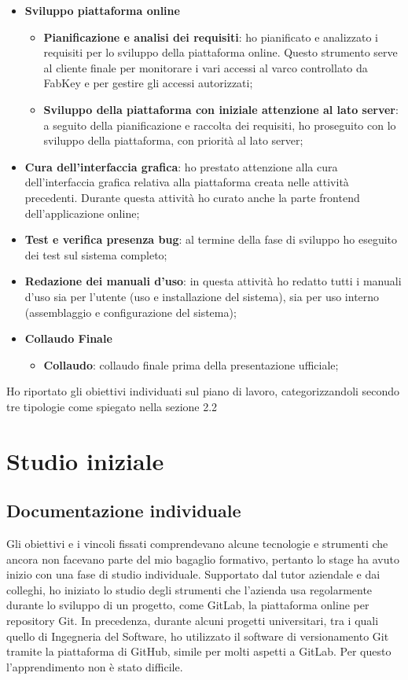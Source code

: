 \begin{itemize}
\item \textbf{Sviluppo piattaforma online}
\begin{itemize}
	\item \textbf{Pianificazione e analisi dei requisiti}: ho pianificato e analizzato i requisiti per lo sviluppo della piattaforma online. Questo strumento serve al cliente finale per monitorare i vari accessi al varco controllato da FabKey e per gestire gli accessi autorizzati;
	\item \textbf{Sviluppo della piattaforma con iniziale attenzione al lato server}: a seguito della pianificazione e raccolta dei requisiti, ho proseguito con lo sviluppo della piattaforma, con priorità al lato server;
\end{itemize}

\item \textbf{Cura dell'interfaccia grafica}: ho prestato attenzione alla cura dell'interfaccia grafica relativa alla piattaforma creata nelle attività precedenti. Durante questa attività ho curato anche la parte frontend dell'applicazione online;
\item \textbf{Test e verifica presenza bug}: al termine della fase di sviluppo ho eseguito dei test sul sistema completo;
\item \textbf{Redazione dei manuali d’uso}: in questa attività ho redatto tutti i manuali d'uso sia per l'utente (uso e installazione del sistema), sia per uso interno (assemblaggio e configurazione del sistema);

\item \textbf{Collaudo Finale}
\begin{itemize}
	\item \textbf{Collaudo}: collaudo finale prima della presentazione ufficiale;
\end{itemize}
\end{itemize}

\medskip

Ho riportato gli obiettivi individuati sul piano di lavoro, categorizzandoli secondo tre tipologie come spiegato nella sezione 2.2


\section{Studio iniziale}
\subsection{Documentazione individuale}
Gli obiettivi e i vincoli fissati comprendevano alcune tecnologie e strumenti che ancora non facevano parte del mio bagaglio formativo, pertanto lo stage ha avuto inizio con una fase di studio individuale.
Supportato dal tutor aziendale e dai colleghi, ho iniziato lo studio degli strumenti che l'azienda usa regolarmente durante lo sviluppo di un progetto, come GitLab, la piattaforma online per repository Git. In precedenza, durante alcuni progetti universitari, tra i quali quello di Ingegneria del Software, ho utilizzato il software di versionamento Git tramite la piattaforma di GitHub, simile per molti aspetti a GitLab. Per questo l'apprendimento non è stato difficile.

